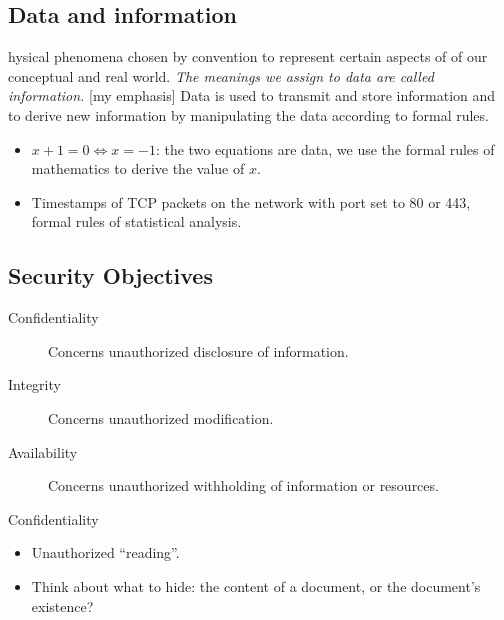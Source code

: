 \documentclass{beamer}
\begin{document}
\subsection{Data and information}

\begin{frame}
  \begin{definition}hysical phenomena chosen by convention to represent certain 
    aspects of of our conceptual and real world.
    \emph{The meanings we assign to data are called information.} [my emphasis]
    Data is used to transmit and store information and to derive new 
    information by manipulating the data according to formal rules.
  \end{definition}
\end{frame}

\begin{frame}
  \begin{example}
    \begin{itemize}
      \item \(x + 1 = 0\iff x = -1\): the two equations are data, we use the 
        formal rules of mathematics to derive the value of \(x\).

      \item Timestamps of TCP packets on the network with port set to 80 or 443, 
        formal rules of statistical analysis.
    \end{itemize}
  \end{example}
\end{frame}

\subsection{Security Objectives}

\begin{frame}
  \begin{description}
    \item[Confidentiality] Concerns unauthorized disclosure of information.
    \item[Integrity] Concerns unauthorized modification.
    \item[Availability] Concerns unauthorized withholding of information or 
      resources.
  \end{description}
\end{frame}

\begin{frame}{Confidentiality}
  \begin{itemize}
    \item Unauthorized \enquote{reading}.

    \item Think about what to hide: the content of a document, or the 
      document's existence?
  \end{itemize}
\end{frame}
\end{document}
